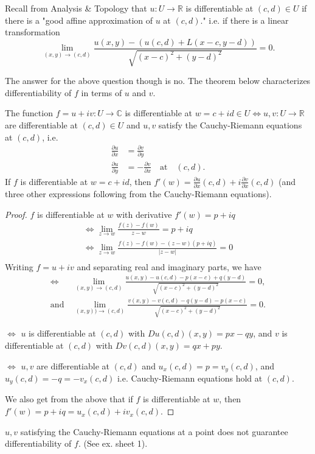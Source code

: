 Recall from Analysis \& Topology that \(u: U \to \mathbb{R}\) is differentiable at \((c,d)\in U\) if there is a "good affine approximation of \(u\) at \((c,d)\)." i.e. if there is a linear transformation
\[
    \lim\limits_{(x,y) \to (c,d)} \frac{u(x,y) - (u(c,d) + L(x-c,y-d))}{\sqrt{(x-c)^2 + (y-d)^2}} = 0.
\]

The answer for the above question though is no. The theorem below characterizes differentiability of \(f\) in terms of \(u\) and \(v\).

\begin{theorem}
    The function \(f = u + iv:U\to \mathbb{C}\) is differentiable at \(w = c + id \in U \iff  u,v: U \to \mathbb{R}\) are differentiable at \((c,d) \in U\) and \(u, v\) satisfy the Cauchy-Riemann equations at \((c,d)\), i.e.
    \begin{align*}
        \frac{\partial u}{\partial x} &= \frac{\partial v}{\partial y}\\
        \frac{\partial u}{\partial y} &= - \frac{\partial v}{\partial x}\quad\text{at}\quad(c,d).
    \end{align*}
    If \(f\) is differentiable at \(w = c + id\), then \(f'(w) = \frac{\partial u}{\partial x} (c,d) + i \frac{\partial v}{\partial x} (c,d)\) (and three other expressions following from the Cauchy-Riemann equations).
\end{theorem}

\begin{proof}
    \(f\) is differentiable at \(w\) with derivative \(f'(w) = p + iq\)
    \begin{gather*}
        \iff \lim_{z \to w} \frac{f(z) - f(w)}{z - w} = p + iq\\
        \iff \lim_{z \to w} \frac{f(z) - f(w) - (z - w)(p + iq)}{\left\vert z-w \right\vert} = 0\\
    \end{gather*}
    Writing \(f = u + iv\) and separating real and imaginary parts, we have
    \begin{align*}
        \iff &\lim\limits_{(x, y) \to (c, d)} \frac{u(x,y) - u(c,d) - p(x - c) + q(y - d)}{\sqrt{(x - c)^2 + (y - d)^2} } = 0,\\
        \text{and}~&\lim\limits_{(x, y)) \to (c,d)} \frac{v(x,y) - v(c,d) - q(y - d) - p(x - c)}{\sqrt{(x - c)^2 + (y - d)^2} } = 0.
    \end{align*}

    \(\iff \) \(u\) is differentiable at \((c,d)\) with \(Du(c,d)(x,y) = px - qy\), and \(v\) is differentiable at \((c,d)\) with \(Dv(c,d)(x,y) = qx + py\).

    \(\iff \) \(u,v\) are differentiable at \((c,d)\) and \(u_x (c,d) = p = v_y(c,d)\), and \(u_y(c,d) = -q = -v_x(c,d)\) i.e. Cauchy-Riemann equations hold at \((c,d)\).

    We also get from the above that if \(f\) is differentiable at \(w\), then \(f'(w) = p + iq = u_x(c,d) + iv_x(c,d)\).
\end{proof}
\begin{remark}
    \(u, v\) satisfying the Cauchy-Riemann equations at a point does not guarantee differentiability of \(f\). (See ex. sheet 1).
\end{remark}

